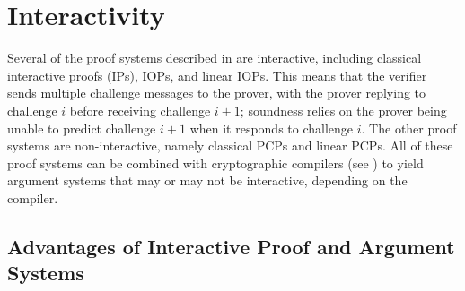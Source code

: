 \section{Interactivity}
\label{paradigms:interactivity} 

Several of the proof systems described in  are interactive, including classical interactive proofs (IPs), IOPs, and linear IOPs. 
This means that the verifier sends multiple challenge messages to the prover, with the prover replying to challenge $i$ before receiving challenge $i+1$;
soundness relies on the prover being unable to predict challenge $i+1$ when it responds to challenge $i$.
The other proof systems are non-interactive, namely classical PCPs and linear PCPs. 
All of these proof systems can be combined with cryptographic compilers (see ) to yield argument systems that may or may not be interactive, depending on the compiler.



\subsection{Advantages of Interactive Proof and Argument Systems}
\label{sec:paradigms:interactivity:advantages}

